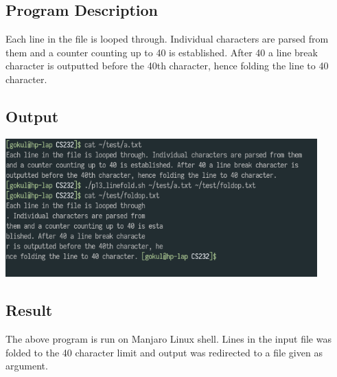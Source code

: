 \documentclass{article}
\begin{document}
\subsection{Program Description}
Each line in the file is looped through. Individual characters are parsed from them
and a counter counting up to 40 is established. After 40 a line break character is 
outputted before the 40th character, hence folding the line to 40 character.

\subsection{Output}
\includegraphics[width=0.9\textwidth]{img/p17.png}\newline

\subsection{Result}
The above program is run on Manjaro Linux shell. Lines in the input file was
folded to the 40 character limit and output was redirected to a file given as 
argument.
\end{document}
